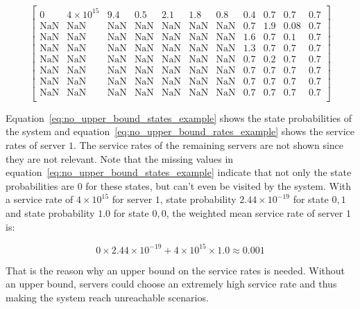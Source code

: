 \begin{equation}\label{eq:no_upper_bound_rates_example}
\begin{bmatrix}
    0 & 4\times10^{15} & 9.4 & 0.5 & 2.1 & 1.8 & 0.8 & 0.4 & 0.7 & 0.7 & 0.7 \\
    \text{NaN} & \text{NaN} & \text{NaN} & \text{NaN} & \text{NaN} & \text{NaN}
    & \text{NaN} & 0.7 & 1.9 & 0.08 & 0.7 \\
    \text{NaN} & \text{NaN} & \text{NaN} & \text{NaN} & \text{NaN} & \text{NaN}
    & \text{NaN} & 1.6 & 0.7 & 0.1 & 0.7 \\
    \text{NaN} & \text{NaN} & \text{NaN} & \text{NaN} & \text{NaN} & \text{NaN}
    & \text{NaN} & 1.3 & 0.7 & 0.7 & 0.7 \\
    \text{NaN} & \text{NaN} & \text{NaN} & \text{NaN} & \text{NaN} & \text{NaN}
    & \text{NaN} & 0.7 & 0.2 & 0.7 & 0.7 \\
    \text{NaN} & \text{NaN} & \text{NaN} & \text{NaN} & \text{NaN} & \text{NaN}
    & \text{NaN} & 0.7 & 0.7 & 0.7 & 0.7 \\
    \text{NaN} & \text{NaN} & \text{NaN} & \text{NaN} & \text{NaN} & \text{NaN}
    & \text{NaN} & 0.7 & 0.7 & 0.7 & 0.7 \\
    \text{NaN} & \text{NaN} & \text{NaN} & \text{NaN} & \text{NaN} & \text{NaN}
    & \text{NaN} & 0.7 & 0.7 & 0.7 & 0.7 \\
\end{bmatrix}
\end{equation}
\normalsize

Equation~\eqref{eq:no_upper_bound_states_example} shows the state probabilities
of the system and equation~\eqref{eq:no_upper_bound_rates_example} shows the
service rates of server \(1\).
The service rates of the remaining servers are not shown since they are not
relevant.
Note that the missing values in
equation~\eqref{eq:no_upper_bound_states_example} indicate that not only the
state probabilities are \(0\) for these states, but can't even be visited by
the system.
With a service rate of \(4\times10^{15}\) for server \(1\), state
probability \(2.44\times10^{-19}\) for state \(0,1\) and state probability
\(1.0\) for state \(0,0\), the weighted mean service rate of server \(1\) is:

\begin{equation}\label{eq:no_upper_bound_mean_rate_example}
    0\times2.44\times10^{-19} + 4\times10^{15}\times1.0 \approx 0.001
\end{equation}
 
That is the reason why an upper bound on the service rates is needed.
Without an upper bound, servers could choose an extremely high service rate and
thus making the system reach unreachable scenarios.

